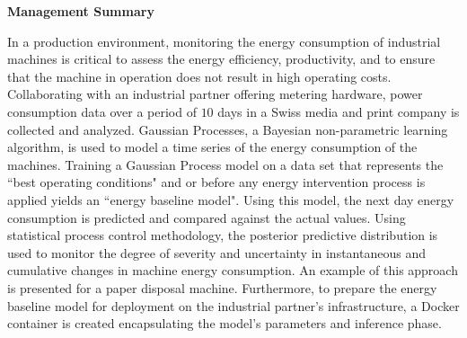 \thispagestyle{plain}
\begin{center}
    \large
    \textbf{Management Summary}
\end{center}

In a production environment, monitoring the energy consumption of industrial machines is critical to assess the energy efficiency, productivity, and to ensure that the machine in operation does not result in high operating costs. Collaborating with an industrial partner offering metering hardware, power consumption data over a period of $10$ days in a Swiss media and print company is collected and analyzed. Gaussian Processes, a Bayesian non-parametric learning algorithm, is used to model a time series of the energy consumption of the machines. Training a Gaussian Process model on a data set that represents the ``best operating conditions" and or before any energy intervention process is applied yields an ``energy baseline model". Using this model, the next day energy consumption is predicted and compared against the actual values. Using statistical process control methodology, the posterior predictive distribution is used to monitor the degree of severity and uncertainty in instantaneous and cumulative changes in machine energy consumption. An example of this approach is presented for a paper disposal machine. Furthermore, to prepare the energy baseline model for deployment on the industrial partner's infrastructure, a Docker container is created encapsulating the model's parameters and inference phase. 
